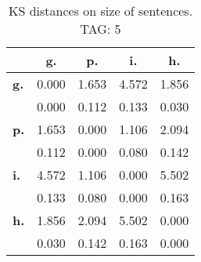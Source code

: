 \begin{table}[h!]
\begin{center}
\begin{tabular}{| l || c | c | c | c |}\hline
 & {\bf g.} & {\bf p.} & {\bf i.} & {\bf h.} \\\hline\hline
{\bf g.} & 0.000 & 1.653 & 4.572 & 1.856 \\
{\bf } & 0.000 & 0.112 & 0.133 & 0.030 \\\hline
{\bf p.} & 1.653 & 0.000 & 1.106 & 2.094 \\
{\bf } & 0.112 & 0.000 & 0.080 & 0.142 \\\hline
{\bf i.} & 4.572 & 1.106 & 0.000 & 5.502 \\
{\bf } & 0.133 & 0.080 & 0.000 & 0.163 \\\hline
{\bf h.} & 1.856 & 2.094 & 5.502 & 0.000 \\
{\bf } & 0.030 & 0.142 & 0.163 & 0.000 \\\hline
\end{tabular}
\caption{KS distances on size of sentences. TAG: 5}
\end{center}
\end{table}